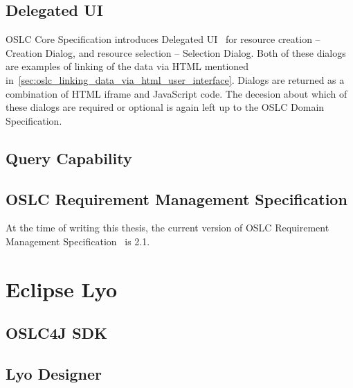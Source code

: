\subsection*{Delegated UI}
OSLC Core Specification introduces Delegated UI \cite{oslc_core_delegated_ui} for resource creation -- Creation Dialog, and resource selection -- Selection Dialog. Both of these dialogs are examples of linking of the data via HTML mentioned in \ref{sec:oslc_linking_data_via_html_user_interface}. Dialogs are returned as a combination of HTML iframe and JavaScript code. The decesion about which of these dialogs are required or optional is again left up to the OSLC Domain Specification.

\subsection*{Query Capability}




\subsection{OSLC Requirement Management Specification}
At the time of writing this thesis, the current version of OSLC Requirement Management Specification \cite{oslc_requirement_management_specification} is 2.1.





\section{Eclipse Lyo}


\subsection*{OSLC4J SDK}

\subsection*{Lyo Designer}

